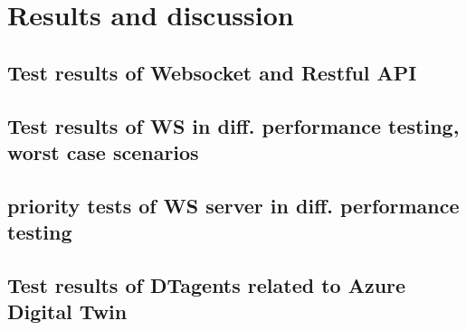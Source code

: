 \chapter{Results and discussion}

\section{Test results of Websocket and Restful API}

\section{Test results of WS in diff. performance testing, worst case scenarios}

\section{priority tests of WS server in diff. performance testing}

\section{Test results of DTagents related to Azure Digital Twin}